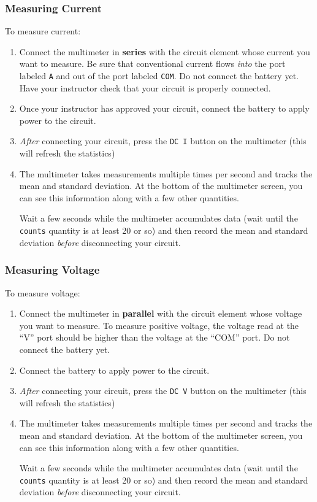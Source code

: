 \documentclass[12pt]{article}
\begin{document}
	\subsubsection*{Measuring Current}
	To measure current:
	\begin{enumerate}
		\item Connect the multimeter in \textbf{series} with the circuit element whose current you want to measure. Be sure that conventional current flows \textit{into} the port labeled \texttt{A} and out of the port labeled \texttt{COM}. Do not connect the battery yet. Have your instructor check that your circuit is properly connected.
		\item Once your instructor has approved your circuit, connect the battery to apply power to the circuit.
		\item \textit{After} connecting your circuit, press the \texttt{DC I} button on the multimeter (this will refresh the statistics) 
		\item The multimeter takes measurements multiple times per second and tracks the mean and standard deviation. At the bottom of the multimeter screen, you can see this information along with a few other quantities. 
		
		Wait a few seconds while the multimeter accumulates data (wait until the \texttt{counts} quantity is at least 20 or so) and then record the mean and standard deviation \textit{before} disconnecting your circuit. 
	\end{enumerate}
	\subsubsection*{Measuring Voltage}
	To measure voltage:
	\begin{enumerate}
	\item Connect the multimeter in \textbf{parallel} with the circuit element whose voltage you want to measure. To measure positive voltage, the voltage read at the ``V'' port should be higher than the voltage at the ``COM'' port.  Do not connect the battery yet. 
	\item Connect the battery to apply power to the circuit.
	\item \textit{After} connecting your circuit, press the \texttt{DC V} button on the multimeter (this will refresh the statistics) 
	\item The multimeter takes measurements multiple times per second and tracks the mean and standard deviation. At the bottom of the multimeter screen, you can see this information along with a few other quantities. 
	
	Wait a few seconds while the multimeter accumulates data (wait until the \texttt{counts} quantity is at least 20 or so) and then record the mean and standard deviation \textit{before} disconnecting your circuit. 
	\end{enumerate}
\end{document}
